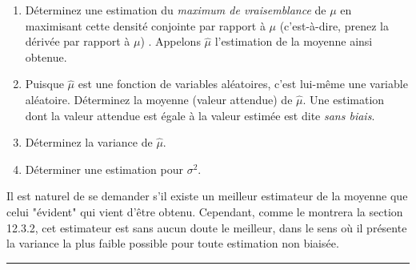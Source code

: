 \documentclass[10pt,twoside,a4paper]{book}
\begin{document}
\begin{enumerate}
  \begin{enumerate}
    \item Déterminez une estimation du \textit{maximum de vraisemblance} de $\mu$ en maximisant cette densité conjointe par rapport à $\mu$ (c'est-à-dire, prenez la dérivée par rapport à $\mu$) . Appelons $\hat{\mu}$ l'estimation de la moyenne ainsi obtenue.
    \item Puisque $\hat{\mu}$ est une fonction de variables aléatoires, c'est lui-même une variable aléatoire. Déterminez la moyenne (valeur attendue) de $\hat{\mu}$. Une estimation dont la valeur attendue est égale à la valeur estimée est dite \textit{sans biais}.
    \item Déterminez la variance de $\hat{\mu}$.
    \item Déterminer une estimation pour $\sigma^2$.
  \end{enumerate}

  \noindent
  Il est naturel de se demander s'il existe un meilleur estimateur de la moyenne que celui "évident" qui vient d'être obtenu. Cependant, comme le montrera la section 12.3.2, cet estimateur est sans aucun doute le meilleur, dans le sens où il présente la variance la plus faible possible pour toute estimation non biaisée.
\end{enumerate}

\par\noindent\rule{\textwidth}{0.6pt}
\end{document}
